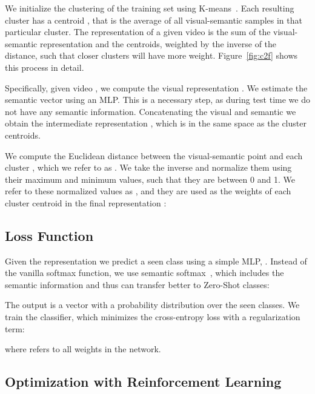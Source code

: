 \documentclass[runningheads]{llncs}
\begin{document}
We initialize the clustering of the training set  using K-means~\cite{forgy1965cluster}. Each resulting cluster  has a centroid , that is the average of all visual-semantic samples in that particular cluster. The \MethodName representation of a given video is the sum of the visual-semantic representation and the centroids, weighted by the inverse of the distance, such that closer clusters will have more weight. Figure~\ref{fig:c2f} shows this process in detail. 

Specifically, given video , we compute the visual representation . We estimate the semantic vector  using an MLP. This is a necessary step, as during test time we do not have any semantic information. Concatenating the visual  and semantic  we obtain the intermediate representation , which is in the same space as the cluster centroids. 

We compute the Euclidean distance  between the visual-semantic point  and each cluster , which we refer to as . We take the inverse  and normalize them using their maximum and minimum values, such that they are between 0 and 1. We refer to these normalized values as , and they are used as the weights of each cluster centroid in the final \MethodName representation :








\subsection{Loss Function}
\label{sec:loss}

Given the \MethodName representation  we predict a seen class using a simple MLP,  . 
Instead of the vanilla softmax function, we use semantic softmax~\cite{ji2018semantic}, 
which includes the semantic information  and thus can transfer better to Zero-Shot classes:


The output  is a vector with a probability distribution over the  seen classes. We train the classifier, which minimizes the cross-entropy loss with a regularization term: 



where  refers to all weights in the network.







\subsection{Optimization with Reinforcement Learning}
\label{subsec:RL}
\end{document}
